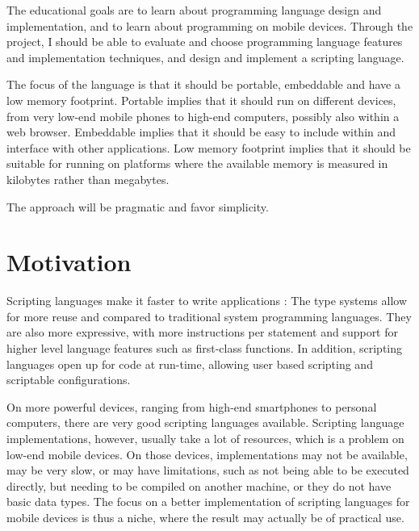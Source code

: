 \documentclass[11pt]{report}
\begin{document}
\begin{comment}
The motivation is that a scripting language makes it is easier to make applications for mobile 
devices, and that existing freely available scripting languages
are very limited, slow, or simply does not run on the low-end mobile devices.
\end{comment}

    The educational goals are to learn about programming language design and
implementation, and to learn about programming on mobile devices. Through the
project, I should be able to evaluate and choose programming language features
and implementation techniques, and design and implement a scripting language.

    The focus of the language is that it should be portable, embeddable and have
a low memory footprint. Portable implies that it should run on different devices,
from very low-end mobile phones to high-end computers, possibly also within a web browser. 
Embeddable implies that it should be easy to include within and interface with
other applications. Low memory footprint implies that it should be suitable for
running on platforms where the available memory is measured in kilobytes rather
than megabytes. 

    The approach will be pragmatic and favor simplicity.

\section{Motivation}
Scripting languages make it faster to write applications \cite{scripting-ousterhout}:
The type systems allow for more reuse and compared to traditional system programming languages.
They are also more expressive, with more instructions per statement and support for higher level language features such as first-class functions.
In addition, scripting languages open up for code at run-time, allowing user based scripting and scriptable configurations.

On more powerful devices, ranging from high-end smartphones to personal computers, there are very good scripting languages available.
Scripting language implementations, however, usually take a lot of resources, which is a problem on low-end mobile devices. On those devices, implementations may not be available, may be very slow, or may have limitations, such as not being able to be executed directly, but needing to be compiled on another machine, or they do not have basic data types.
The focus on a better implementation of scripting languages for mobile devices is thus a niche, where the result may actually be of practical use.
\end{document}
